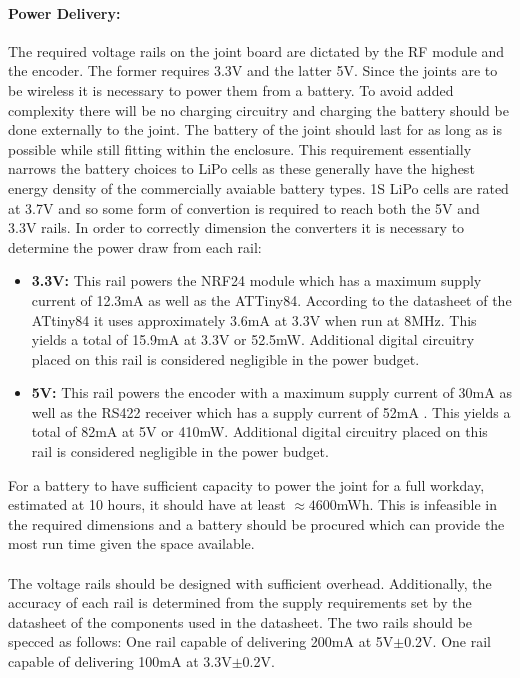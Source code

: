 \paragraph{Power Delivery:} %
\label{par:power_delivery}
The required voltage rails on the joint board are dictated by the RF module and the encoder.
The former requires 3.3V and the latter 5V.
Since the joints are to be wireless it is necessary to power them from a battery.
To avoid added complexity there will be no charging circuitry and charging the battery should be done externally to the joint.
The battery of the joint should last for as long as is possible while still fitting within the enclosure.
This requirement essentially narrows the battery choices to LiPo cells as these generally have the highest energy density of the commercially avaiable battery types.
1S LiPo cells are rated at 3.7V and so some form of convertion is required to reach both the 5V and 3.3V rails.
In order to correctly dimension the converters it is necessary to determine the power draw from each rail:
\begin{itemize}
 	\item \textbf{3.3V:} This rail powers the NRF24 module which has a maximum supply current of 12.3mA \cite{NFR24L01} as well as the ATTiny84.
 	According to the datasheet of the ATtiny84 it uses approximately 3.6mA at 3.3V when run at 8MHz.   
 	This yields a total of 15.9mA at 3.3V or 52.5mW.
 	Additional digital circuitry placed on this rail is considered negligible in the power budget.
 	\item \textbf{5V:} This rail powers the encoder with a maximum supply current of 30mA \cite{RLC2IC} as well as the RS422 receiver which has a supply current of 52mA \cite{rs422rec}.
 	This yields a total of 82mA at 5V or 410mW.
 	Additional digital circuitry placed on this rail is considered negligible in the power budget.
\end{itemize}
For a battery to have sufficient capacity to power the joint for a full workday, estimated at 10 hours, it should have at least $\approx4600$mWh.
This is infeasible in the required dimensions and a battery should be procured which can provide the most run time given the space available.
\\~\\
The voltage rails should be designed with sufficient overhead.
Additionally, the accuracy of each rail is determined from the supply requirements set by the datasheet of the components used in the datasheet.
The two rails should be specced as follows:
One rail capable of delivering 200mA at 5V$\pm$0.2V.
One rail capable of delivering 100mA at 3.3V$\pm$0.2V.

